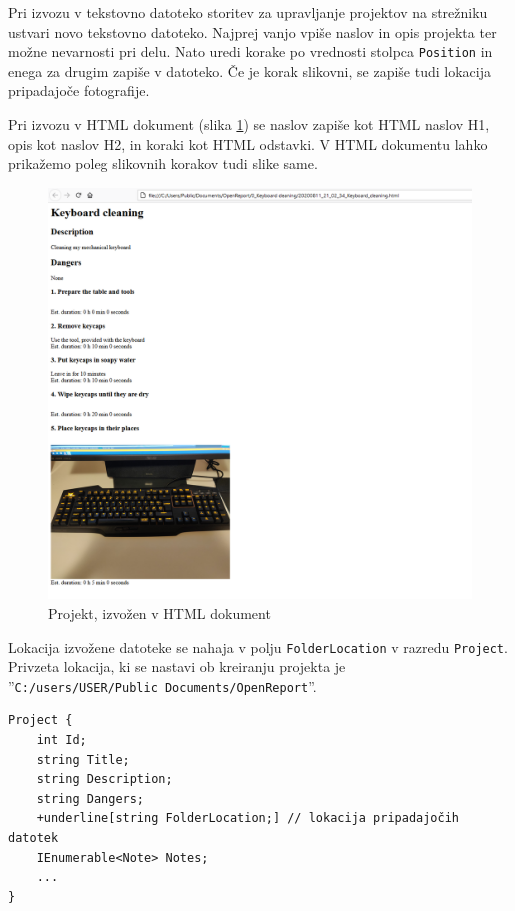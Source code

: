 \documentclass[a4paper, 12pt]{book}
\begin{document}
Pri izvozu v tekstovno datoteko storitev za upravljanje projektov na strežniku ustvari novo tekstovno datoteko.
Najprej vanjo vpiše naslov in opis projekta ter možne nevarnosti pri delu.
Nato uredi korake po vrednosti stolpca \texttt{Position} in enega za drugim zapiše v datoteko.
Če je korak slikovni, se zapiše tudi lokacija pripadajoče fotografije.

Pri izvozu v HTML dokument (slika \ref{export_html}) se naslov zapiše kot HTML naslov H1, opis kot naslov H2, in koraki kot HTML odstavki.
V HTML dokumentu lahko prikažemo poleg slikovnih korakov tudi slike same.

\begin{figure}[H]
\begin{center}
\includegraphics[width=13cm]{export_html}
\end{center}
\caption{Projekt, izvožen v HTML dokument}
\label{export_html}
\end{figure}

Lokacija izvožene datoteke se nahaja v polju \texttt{FolderLocation} v razredu \texttt{Project}.
Privzeta lokacija, ki se nastavi ob kreiranju projekta je 
\\''\texttt{C:/users/USER/Public Documents/OpenReport}''.

\begin{Verbatim}[commandchars=+\[\]]
Project {
    int Id; 
    string Title; 
    string Description; 
    string Dangers; 
    +underline[string FolderLocation;] // lokacija pripadajočih datotek 
    IEnumerable<Note> Notes; 
    ... 
}
\end{Verbatim}
\end{document}
